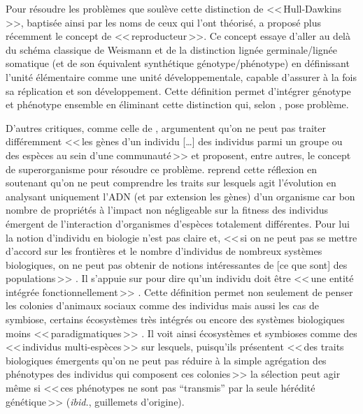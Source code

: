Pour résoudre les problèmes que soulève cette distinction de <<\,Hull-Dawkins\,>>, baptisée ainsi par les noms de ceux qui l'ont théorisé, \cite{griesemer2000reproductionandthereductionofgenetics} a proposé plus récemment le concept de <<\,reproducteur\,>>. Ce concept essaye d'aller au delà du schéma classique de Weismann et de la distinction lignée germinale/lignée somatique (et de son équivalent synthétique génotype/phénotype) en définissant l'unité élémentaire comme une unité développementale, capable d'assurer à la fois sa réplication et son développement. Cette définition permet d'intégrer génotype et phénotype ensemble en éliminant cette distinction qui, selon \cite{griesemer2000reproductionandthereductionofgenetics,griesemer2002whatisepiaboutepigenetics}, pose problème. 

D'autres critiques, comme celle de \cite{wilson1989revivingsuperorganism}, argumentent qu'on ne peut pas traiter différemment <<\,les gènes d'un individu [\ldots] des individus parmi un groupe ou des espèces au sein d'une communauté\,>> et proposent, entre autres, le concept de superorganisme pour résoudre ce problème. \cite{bouchard2009understandingcolonialtraitsusingsymbiosisresearchandecosystemecology,bouchard2011darwinismwithoutpopulationsamoreinclusiveunderstandingofsotf} reprend cette réflexion en soutenant qu'on ne peut comprendre les traits sur lesquels agit l'évolution en analysant uniquement l'ADN (et par extension les gènes) d'un organisme car bon nombre de propriétés à l'impact non négligeable sur la fitness des individus émergent de l'interaction d'organismes d'espèces totalement différentes. Pour lui la notion d'individu en biologie n'est pas claire et, <<\,si on ne peut pas se mettre d'accord sur les frontières et le nombre d'individus de nombreux systèmes biologiques, on ne peut pas obtenir de notions intéressantes de [ce que sont] des populations\,>> \citep[p.~17]{bouchard2011darwinismwithoutpopulationsamoreinclusiveunderstandingofsotf}. Il s'appuie sur \cite{wilson1989revivingsuperorganism} pour dire qu'un individu doit être <<\,une entité intégrée fonctionnellement\,>> \citep[p.~3]{bouchard2009understandingcolonialtraitsusingsymbiosisresearchandecosystemecology}. Cette définition permet non seulement de penser les colonies d'animaux sociaux comme des individus mais aussi les cas de symbiose, certains écosystèmes très intégrés ou encore des systèmes biologiques moins <<\,paradigmatiques\,>> \citep{bouchard2009understandingcolonialtraitsusingsymbiosisresearchandecosystemecology,bouchard2011darwinismwithoutpopulationsamoreinclusiveunderstandingofsotf}. Il voit ainsi écosystèmes et symbioses comme des <<\,individus multi-espèces\,>> \citep[p.~10]{bouchard2009understandingcolonialtraitsusingsymbiosisresearchandecosystemecology} sur lesquels, puisqu'ils présentent <<\,des traits biologiques émergents qu'on ne peut pas réduire à la simple agrégation des phénotypes des individus qui composent ces colonies\,>> la sélection peut agir même si <<\,ces phénotypes ne sont pas ``transmis'' par la seule hérédité génétique\,>> (\emph{ibid.}, guillemets d'origine).


